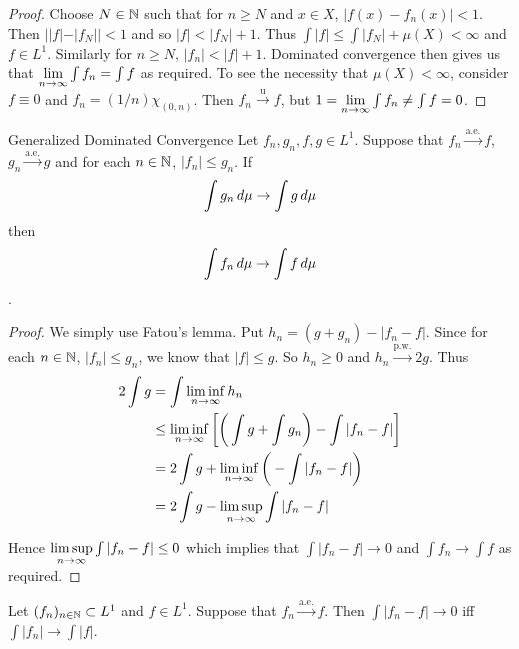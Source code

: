 \documentclass{book}
\begin{document}
	\begin{proof}
		Choose $N \in \mathbb{N}$ such that for $n \geq N$ and $x \in X$, $|f(x) - f_n(x)| < 1$. Then $||f| - |f_N|| < 1$ and so $|f| < |f_N| +1$. Thus $\int |f| \leq \int |f_N| +\mu(X) < \infty$ and $f \in L^1$. Similarly for $n \geq N$, $|f_n| < |f|+ 1$. Dominated convergence then gives us that $\lim \limits_{n \rightarrow \infty} \int f_n = \int f$ as required. To see the necessity that $\mu(X) < \infty$, consider $f \equiv 0$ and $f_n = (1/n) \chi_{(0,n)}$. Then $f_n \xrightarrow{\text{u}} f$, but $1 = \lim \limits_{n \rightarrow \infty} \int f_n \neq \int f = 0$.  
	\end{proof}
	
	\begin{ex}  {Generalized Dominated Convergence}
		Let $f_n,g_n,f,g \in L^1$. Suppose that $f_n \xrightarrow{\text{a.e.}} f$, $g_n \xrightarrow{\text{a.e.}} g$ and for each $n \in \mathbb{N}$, $|f_n| \leq g_n$. If $$\int g_n \, d \mu \rightarrow \int g \, d \mu $$ then $$\int f_n \, d \mu \rightarrow \int f \, d \mu$$.
	\end{ex}
	
	
	\begin{proof}
		We simply use Fatou's lemma. Put $h_n = (g + g_n) - |f_n - f|$. Since for each $n \in \mathbb{N}$, $|f_n| \leq g_n$, we know that $|f| \leq g$. So $h_n \geq 0$ and $h_n \xrightarrow{\text{p.w.}} 2g$. Thus 
		\begin{align*}
			2\int g 
			&= \int \liminf \limits_{n \rightarrow \infty} h_n\\
			&\leq \liminf \limits_{n \rightarrow \infty} \bigg[ \bigg(\int g +\int g_n\bigg) - \int |f_n -f|\bigg]\\
			&= 2\int g + \liminf \limits_{n \rightarrow \infty} \bigg( - \int |f_n - f| \bigg)\\
			&= 2\int g - \limsup \limits_{n \rightarrow \infty} \int |f_n - f| 
		\end{align*}
		
		Hence $\limsup \limits_{n \rightarrow \infty} \int |f_n - f|  \leq 0$ which implies that $\int |f_n - f| \rightarrow 0$ and $\int f_n \rightarrow \int f$ as required. 
	\end{proof}
	
	\begin{ex}  
		Let $(f_n)_{n \in \mathbb{N}} \subset L^1$ and $f \in L^1$. Suppose that $f_n \xrightarrow{\text{a.e.}} f$. Then $\int |f_n - f| \rightarrow 0$ iff $\int |f_n| \rightarrow \int |f|$.
	\end{ex}
	
\end{document}
